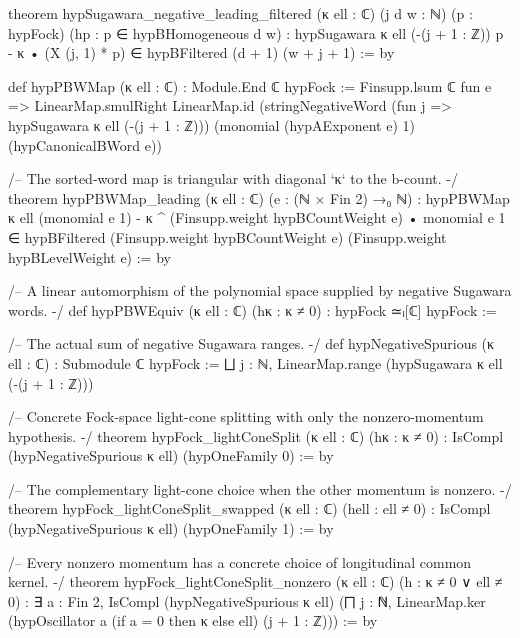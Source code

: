 \begin{leancode}
theorem hypSugawara_negative_leading_filtered (κ ell : ℂ) (j d w : ℕ)
    (p : hypFock) (hp : p ∈ hypBHomogeneous d w) :
    hypSugawara κ ell (-(j + 1 : ℤ)) p - κ • (X (j, 1) * p) ∈
      hypBFiltered (d + 1) (w + j + 1) := by

def hypPBWMap (κ ell : ℂ) : Module.End ℂ hypFock :=
  Finsupp.lsum ℂ fun e => LinearMap.smulRight LinearMap.id
    (stringNegativeWord (fun j => hypSugawara κ ell (-(j + 1 : ℤ)))
      (monomial (hypAExponent e) 1) (hypCanonicalBWord e))

/-- The sorted-word map is triangular with diagonal `κ` to the b-count. -/
theorem hypPBWMap_leading (κ ell : ℂ) (e : (ℕ × Fin 2) →₀ ℕ) :
    hypPBWMap κ ell (monomial e 1) -
      κ ^ (Finsupp.weight hypBCountWeight e) • monomial e 1 ∈
      hypBFiltered (Finsupp.weight hypBCountWeight e) (Finsupp.weight hypBLevelWeight e) := by

/-- A linear automorphism of the polynomial space supplied by negative Sugawara words. -/
def hypPBWEquiv (κ ell : ℂ) (hκ : κ ≠ 0) : hypFock ≃ₗ[ℂ] hypFock :=

/-- The actual sum of negative Sugawara ranges. -/
def hypNegativeSpurious (κ ell : ℂ) : Submodule ℂ hypFock :=
  ⨆ j : ℕ, LinearMap.range (hypSugawara κ ell (-(j + 1 : ℤ)))

/-- Concrete Fock-space light-cone splitting with only the nonzero-momentum hypothesis. -/
theorem hypFock_lightConeSplit (κ ell : ℂ) (hκ : κ ≠ 0) :
    IsCompl (hypNegativeSpurious κ ell) (hypOneFamily 0) := by

/-- The complementary light-cone choice when the other momentum is nonzero. -/
theorem hypFock_lightConeSplit_swapped (κ ell : ℂ) (hell : ell ≠ 0) :
    IsCompl (hypNegativeSpurious κ ell) (hypOneFamily 1) := by

/-- Every nonzero momentum has a concrete choice of longitudinal common kernel. -/
theorem hypFock_lightConeSplit_nonzero (κ ell : ℂ) (h : κ ≠ 0 ∨ ell ≠ 0) :
    ∃ a : Fin 2, IsCompl (hypNegativeSpurious κ ell)
      (⨅ j : ℕ, LinearMap.ker (hypOscillator a (if a = 0 then κ else ell) (j + 1 : ℤ))) := by
\end{leancode}

